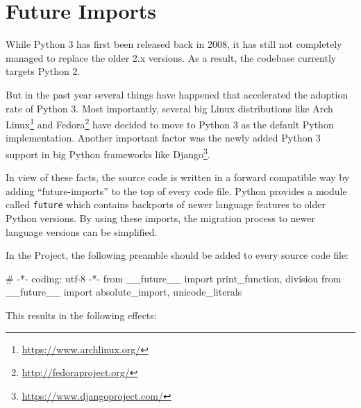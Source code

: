 
\section{Future Imports}\label{sec:development:futures}

While Python 3 has first been released back in 2008, it has still not completely
managed to replace the older 2.x versions. As a result, the \tangible{} codebase
currently targets Python 2.

But in the past year several things have happened that accelerated the adoption
rate of Python 3. Most importantly, several big Linux distributions like Arch
Linux\footnote{\url{https://www.archlinux.org/}} and
Fedora\footnote{\url{http://fedoraproject.org/}} have decided to move to Python
3 as the default Python implementation. Another important factor was the newly
added Python 3 support in big Python frameworks like
Django\footnote{\url{https://www.djangoproject.com/}}.

In view of these facts, the \tangible{} source code is written in a forward
compatible way by adding ``future-imports'' to the top of every code file.
Python provides a module called \texttt{future} which contains backports of
newer language features to older Python versions. By using these imports, the
migration process to newer language versions can be simplified.

In the \tangible{} Project, the following preamble should be added to every
source code file:

\vspace{.5\baselineskip}
\begin{pythoncode}
# -*- coding: utf-8 -*-
from __future__ import print_function, division
from __future__ import absolute_import, unicode_literals
\end{pythoncode}

\noindent This results in the following effects:

